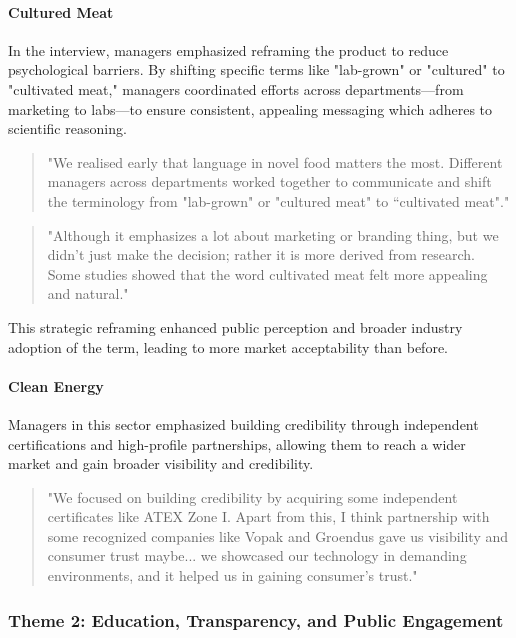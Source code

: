 \paragraph{Cultured Meat}
In the interview, managers emphasized reframing the product to reduce psychological barriers. By shifting specific terms like "lab-grown" or "cultured" to "cultivated meat," managers coordinated efforts across departments—from marketing to labs—to ensure consistent, appealing messaging which adheres to scientific reasoning.
\begin{quote}
	"We realised early that language in novel food matters the most. Different managers across departments worked together to communicate and shift the terminology from "lab-grown" or "cultured meat" to “cultivated meat"."
\end{quote}
\begin{quote}
	"Although it emphasizes a lot about marketing or branding thing, but we didn't just make the decision; rather it is more derived from research. Some studies showed that the word cultivated meat felt more appealing and natural."
\end{quote}
This strategic reframing enhanced public perception and broader industry adoption of the term, leading to more market acceptability than before.

\paragraph{Clean Energy}
Managers in this sector emphasized building credibility through independent certifications and high-profile partnerships, allowing them to reach a wider market and gain broader visibility and credibility.
\begin{quote}
	"We focused on building credibility by acquiring some independent certificates like ATEX Zone I. Apart from this, I think partnership with some recognized companies like Vopak and Groendus gave us visibility and consumer trust maybe... we showcased our technology in demanding environments, and it helped us in gaining consumer's trust."
\end{quote}

\subsubsection{Theme 2: Education, Transparency, and Public Engagement}
